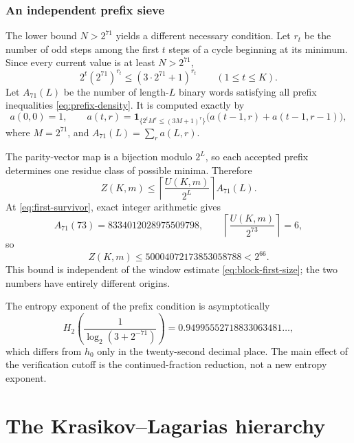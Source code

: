 \documentclass[11pt]{amsart}
\numberwithin{equation}{section}
\newcommand{\one}{\mathbf 1}
\begin{document}
\section{An independent prefix sieve}\label{sec:prefix-sieve}

The lower bound $N>2^{71}$ yields a different necessary condition.  Let $r_t$ be the number of odd steps among the first $t$ steps of a cycle beginning at its minimum.  Since every current value is at least $N>2^{71}$,
\begin{equation}\label{eq:prefix-density}
2^t(2^{71})^{r_t}
\le(3\cdot2^{71}+1)^{r_t}
\qquad(1\le t\le K).
\end{equation}
Let $A_{71}(L)$ be the number of length-$L$ binary words satisfying all prefix inequalities \eqref{eq:prefix-density}.  It is computed exactly by
\begin{equation}\label{eq:prefix-DP}
a(0,0)=1,
\qquad
a(t,r)=
\one_{\{2^tM^r\le(3M+1)^r\}}
\bigl(a(t-1,r)+a(t-1,r-1)\bigr),
\end{equation}
where $M=2^{71}$, and $A_{71}(L)=\sum_r a(L,r)$.

The parity-vector map is a bijection modulo $2^L$, so each accepted prefix determines one residue class of possible minima.  Therefore
\begin{equation}\label{eq:prefix-bound}
Z(K,m)
\le
\left\lceil\frac{U(K,m)}{2^L}\right\rceil A_{71}(L).
\end{equation}
At \eqref{eq:first-survivor}, exact integer arithmetic gives
\begin{equation}\label{eq:A73}
A_{71}(73)=8334012028975509798,
\qquad
\left\lceil\frac{U(K,m)}{2^{73}}\right\rceil=6,
\end{equation}
so
\begin{equation}\label{eq:prefix-first}
Z(K,m)
\le50004072173853058788
<2^{66}.
\end{equation}
This bound is independent of the window estimate \eqref{eq:block-first-size}; the two numbers have entirely different origins.

The entropy exponent of the prefix condition is asymptotically
\[
H_2\left(\frac1{\log_2(3+2^{-71})}\right)
=0.94995552718833063481\ldots,
\]
which differs from $h_0$ only in the twenty-second decimal place.  The main effect of the verification cutoff is the continued-fraction reduction, not a new entropy exponent.

\part{The Krasikov--Lagarias hierarchy}
\end{document}
